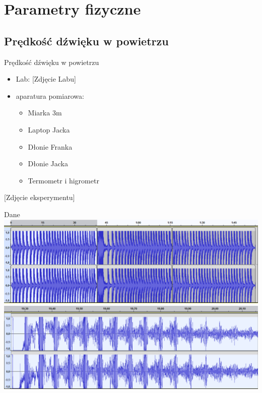 \documentclass{beamer}
\begin{document}
\section{Parametry fizyczne}

\subsection{Prędkość dźwięku w powietrzu}

\begin{frame}{Prędkość dźwięku w powietrzu}
\begin{itemize}
\item Lab: [Zdjęcie Labu]
\item aparatura pomiarowa:
	\begin{itemize}
		\item Miarka $3$m
		\item Laptop Jacka
		\item Dłonie Franka
		\item Dłonie Jacka
		\item Termometr i higrometr
	\end{itemize}
\end{itemize}
[Zdjęcie eksperymentu]
\end{frame}

\begin{frame}{Dane}
\includegraphics[width=\linewidth]{Data.png}
\includegraphics[width=\linewidth]{Data_zoom.png}

\end{frame}
\end{document}
